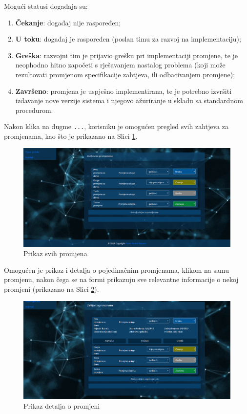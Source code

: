 \documentclass[12pt,a4paper]{article}
\begin{document}
Mogući statusi događaja su:

\begin{enumerate}
\item \textbf{Čekanje}: događaj nije raspoređen;
\item \textbf{U toku}: događaj je raspoređen (poslan timu za razvoj na implementaciju);
\item \textbf{Greška}: razvojni tim je prijavio grešku pri implementaciji promjene, te je neophodno hitno započeti s rješavanjem nastalog problema (koji može rezultovati promjenom specifikacije zahtjeva, ili odbacivanjem promjene);
\item \textbf{Završeno}: promjena je uspješno implementirana, te je potrebno izvršiti izdavanje nove verzije sistema i njegovo ažuriranje u skladu sa standardnom procedurom.
\end{enumerate}

Nakon klika na dugme \texttt{...}, korisniku je omogućen pregled svih zahtjeva za promjenama, kao što je prikazano na Slici \ref{s8}.

\begin{figure}[H]
\center
\includegraphics[scale=0.35]{../res/UI/changeAll.PNG}
\caption{Prikaz svih promjena}
\label{s8}
\end{figure}

Omogućen je prikaz i detalja o pojedinačnim promjenama, klikom na samu promjenu, nakon čega se na formi prikazuju sve relevantne informacije o nekoj promjeni (prikazano na Slici \ref{s9}).

\begin{figure}[H]
\center
\includegraphics[scale=0.35]{../res/UI/changeDetails.PNG}
\caption{Prikaz detalja o promjeni}
\label{s9}
\end{figure}
\end{document}
